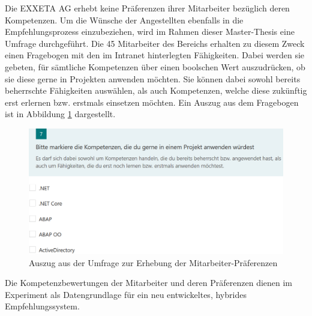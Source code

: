 Die EXXETA AG erhebt keine Präferenzen ihrer Mitarbeiter bezüglich deren Kompetenzen. Um die Wünsche der Angestellten ebenfalls in die Empfehlungsprozess einzubeziehen, wird im Rahmen dieser Master-Thesis eine Umfrage durchgeführt. Die 45 Mitarbeiter des Bereichs \JES erhalten zu diesem Zweck einen Fragebogen mit den \anzFaehigkeiten im Intranet hinterlegten Fähigkeiten. Dabei werden sie gebeten, für sämtliche Kompetenzen über einen boolschen Wert auszudrücken, ob sie diese gerne in Projekten anwenden möchten. Sie können dabei sowohl bereits beherrschte Fähigkeiten auswählen, als auch Kompetenzen, welche diese zukünftig erst erlernen bzw. erstmals einsetzen möchten. Ein Auszug aus dem Fragebogen ist in Abbildung \ref{fig:methodik:versuchsaufbau:abb1} dargestellt.

\begin{figure}[h]
	\centering
	\includegraphics[width=1\textwidth]{gfx/Umfage_Faehigkeiten.png}
	\caption{Auszug aus der Umfrage zur Erhebung der Mitarbeiter-Präferenzen}
	\label{fig:methodik:versuchsaufbau:abb1}
\end{figure}

Die Kompetenzbewertungen der Mitarbeiter und deren Präferenzen dienen im Experiment als Datengrundlage für ein neu entwickeltes, hybrides Empfehlungssystem.

